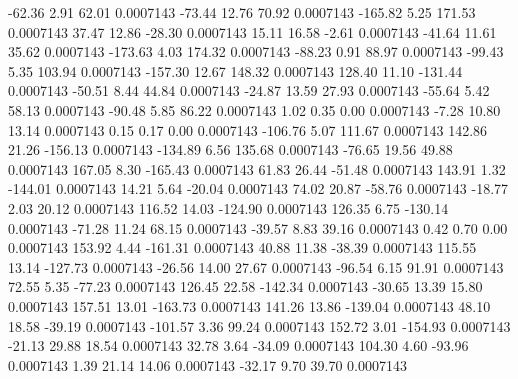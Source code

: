       -62.36        2.91       62.01     0.0007143
      -73.44       12.76       70.92     0.0007143
     -165.82        5.25      171.53     0.0007143
       37.47       12.86      -28.30     0.0007143
       15.11       16.58       -2.61     0.0007143
      -41.64       11.61       35.62     0.0007143
     -173.63        4.03      174.32     0.0007143
      -88.23        0.91       88.97     0.0007143
      -99.43        5.35      103.94     0.0007143
     -157.30       12.67      148.32     0.0007143
      128.40       11.10     -131.44     0.0007143
      -50.51        8.44       44.84     0.0007143
      -24.87       13.59       27.93     0.0007143
      -55.64        5.42       58.13     0.0007143
      -90.48        5.85       86.22     0.0007143
        1.02        0.35        0.00     0.0007143
       -7.28       10.80       13.14     0.0007143
        0.15        0.17        0.00     0.0007143
     -106.76        5.07      111.67     0.0007143
      142.86       21.26     -156.13     0.0007143
     -134.89        6.56      135.68     0.0007143
      -76.65       19.56       49.88     0.0007143
      167.05        8.30     -165.43     0.0007143
       61.83       26.44      -51.48     0.0007143
      143.91        1.32     -144.01     0.0007143
       14.21        5.64      -20.04     0.0007143
       74.02       20.87      -58.76     0.0007143
      -18.77        2.03       20.12     0.0007143
      116.52       14.03     -124.90     0.0007143
      126.35        6.75     -130.14     0.0007143
      -71.28       11.24       68.15     0.0007143
      -39.57        8.83       39.16     0.0007143
        0.42        0.70        0.00     0.0007143
      153.92        4.44     -161.31     0.0007143
       40.88       11.38      -38.39     0.0007143
      115.55       13.14     -127.73     0.0007143
      -26.56       14.00       27.67     0.0007143
      -96.54        6.15       91.91     0.0007143
       72.55        5.35      -77.23     0.0007143
      126.45       22.58     -142.34     0.0007143
      -30.65       13.39       15.80     0.0007143
      157.51       13.01     -163.73     0.0007143
      141.26       13.86     -139.04     0.0007143
       48.10       18.58      -39.19     0.0007143
     -101.57        3.36       99.24     0.0007143
      152.72        3.01     -154.93     0.0007143
      -21.13       29.88       18.54     0.0007143
       32.78        3.64      -34.09     0.0007143
      104.30        4.60      -93.96     0.0007143
        1.39       21.14       14.06     0.0007143
      -32.17        9.70       39.70     0.0007143
